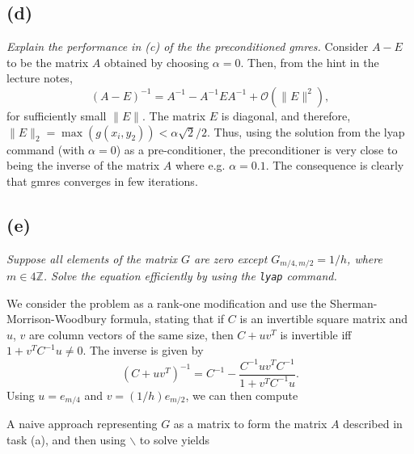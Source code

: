 \subsection*{(d)}
\emph{Explain the performance in (c) of the the preconditioned gmres. 
}
Consider $A-E$ to be the matrix $A$ obtained by choosing $\alpha = 0$. Then, from the hint in the lecture notes, 
\begin{equation}
(A-E)^{-1} = A^{-1}-A^{-1}EA^{-1}+\mathcal O(\|E\|^2),
\end{equation}
for sufficiently small $\|E\|$. The matrix $E$ is diagonal, and therefore, $\|E\|_2 = \max(g(x_i,y_2))<\alpha \sqrt{2}/2$. Thus, using the solution from the lyap command (with $\alpha = 0$) as a pre-conditioner, the preconditioner is very close to being the inverse of the matrix $A$ where e.g. $\alpha = 0.1$. The consequence is clearly that gmres converges in few iterations. 

\subsection*{(e)}
\emph{Suppose all elements of the matrix $G$ are zero except $G_{m/4,m/2} = 1/h$, where $m\in 4\mathbb Z$. Solve the equation efficiently by using the \texttt{lyap} command.}

We consider the problem as a rank-one modification and use the Sherman-Morrison-Woodbury formula, stating that if $C$ is an invertible square matrix and $u$, $v$ are column vectors of the same size, then $C+uv^T$ is invertible iff $1+v^TC^{-1}u\neq 0$. The inverse is given by
\begin{equation}
(C+uv^T)^{-1} = C^{-1}-\frac{C^{-1}uv^TC^{-1}}{1+v^TC^{-1}u}.
\end{equation}
Using $u = e_{m/4}$ and $v  = (1/h)e_{m/2}$, we can then compute 

A naive approach representing $G$ as a matrix to form the matrix $A$ described in task (a), and then using $\backslash$ to solve yields 





